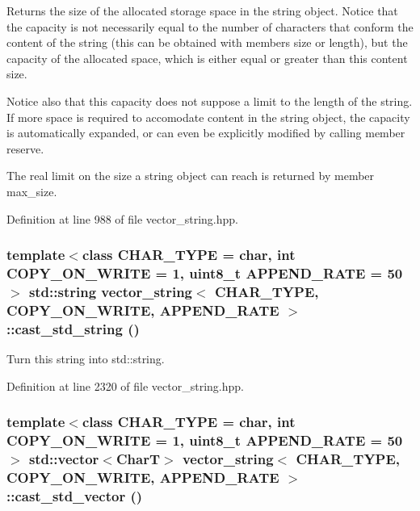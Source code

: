 Returns the size of the allocated storage space in the string object. Notice that the capacity is not necessarily equal to the number of characters that conform the content of the string (this can be obtained with members size or length), but the capacity of the allocated space, which is either equal or greater than this content size.

Notice also that this capacity does not suppose a limit to the length of the string. If more space is required to accomodate content in the string object, the capacity is automatically expanded, or can even be explicitly modified by calling member reserve.

The real limit on the size a string object can reach is returned by member max\_\-size. 

Definition at line 988 of file vector\_\-string.hpp.\hypertarget{classvector__string_5648f7c6fcf1d8b3c89accab7362ba00}{
\subsubsection[{cast\_\-std\_\-string}]{\setlength{\rightskip}{0pt plus 5cm}template$<$class CHAR\_\-TYPE  = char, int COPY\_\-ON\_\-WRITE = 1, uint8\_\-t APPEND\_\-RATE = 50$>$ std::string {\bf vector\_\-string}$<$ CHAR\_\-TYPE, COPY\_\-ON\_\-WRITE, APPEND\_\-RATE $>$::cast\_\-std\_\-string ()}}
\label{classvector__string_5648f7c6fcf1d8b3c89accab7362ba00}


Turn this string into std::string. 

Definition at line 2320 of file vector\_\-string.hpp.\hypertarget{classvector__string_752e8dc22949fe14102e7164f5a970c3}{
\subsubsection[{cast\_\-std\_\-vector}]{\setlength{\rightskip}{0pt plus 5cm}template$<$class CHAR\_\-TYPE  = char, int COPY\_\-ON\_\-WRITE = 1, uint8\_\-t APPEND\_\-RATE = 50$>$ std::vector$<$CharT$>$ {\bf vector\_\-string}$<$ CHAR\_\-TYPE, COPY\_\-ON\_\-WRITE, APPEND\_\-RATE $>$::cast\_\-std\_\-vector ()}}
\label{classvector__string_752e8dc22949fe14102e7164f5a970c3}


